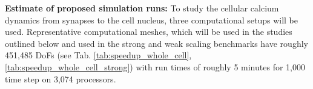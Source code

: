 %
\noindent \textbf{Estimate of proposed simulation runs:} 
To study the cellular calcium dynamics from synapses to the cell nucleus, three computational setups will be used. Representative computational meshes, which will be used in the
studies outlined below and used in the strong and weak scaling benchmarks have roughly 451,485 DoFs (see Tab. \ref{tab:speedup_whole_cell}, \ref{tab:speedup_whole_cell_strong}) with run times of roughly 5 minutes for 1,000 time step on 3,074 processors.


